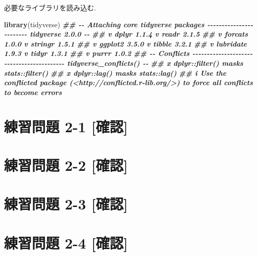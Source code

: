 \documentclass[
]{book}
\newenvironment{Shaded}{\begin{snugshade}}{\end{snugshade}}
\newcommand{\DocumentationTok}[1]{\textcolor[rgb]{0.56,0.35,0.01}{\textbf{\textit{#1}}}}
\newcommand{\FunctionTok}[1]{\textcolor[rgb]{0.13,0.29,0.53}{\textbf{#1}}}
\newcommand{\NormalTok}[1]{#1}
\begin{document}
必要なライブラリを読み込む.

\begin{Shaded}
\begin{Highlighting}[]
\FunctionTok{library}\NormalTok{(tidyverse)}
\DocumentationTok{\#\# {-}{-} Attaching core tidyverse packages {-}{-}{-}{-}{-}{-}{-}{-}{-}{-}{-}{-}{-}{-}{-}{-}{-}{-}{-}{-}{-}{-}{-}{-} tidyverse 2.0.0 {-}{-}}
\DocumentationTok{\#\# v dplyr     1.1.4     v readr     2.1.5}
\DocumentationTok{\#\# v forcats   1.0.0     v stringr   1.5.1}
\DocumentationTok{\#\# v ggplot2   3.5.0     v tibble    3.2.1}
\DocumentationTok{\#\# v lubridate 1.9.3     v tidyr     1.3.1}
\DocumentationTok{\#\# v purrr     1.0.2     }
\DocumentationTok{\#\# {-}{-} Conflicts {-}{-}{-}{-}{-}{-}{-}{-}{-}{-}{-}{-}{-}{-}{-}{-}{-}{-}{-}{-}{-}{-}{-}{-}{-}{-}{-}{-}{-}{-}{-}{-}{-}{-}{-}{-}{-}{-}{-}{-}{-}{-} tidyverse\_conflicts() {-}{-}}
\DocumentationTok{\#\# x dplyr::filter() masks stats::filter()}
\DocumentationTok{\#\# x dplyr::lag()    masks stats::lag()}
\DocumentationTok{\#\# i Use the conflicted package (\textless{}http://conflicted.r{-}lib.org/\textgreater{}) to force all conflicts to become errors}
\end{Highlighting}
\end{Shaded}

\hypertarget{ux7df4ux7fd2ux554fux984c-2-1-ux78baux8a8d}{%
\section*{練習問題 2-1 {[}確認{]}}\label{ux7df4ux7fd2ux554fux984c-2-1-ux78baux8a8d}}

\hypertarget{ux7df4ux7fd2ux554fux984c-2-2-ux78baux8a8d}{%
\section*{練習問題 2-2 {[}確認{]}}\label{ux7df4ux7fd2ux554fux984c-2-2-ux78baux8a8d}}

\hypertarget{ux7df4ux7fd2ux554fux984c-2-3-ux78baux8a8d}{%
\section*{練習問題 2-3 {[}確認{]}}\label{ux7df4ux7fd2ux554fux984c-2-3-ux78baux8a8d}}

\hypertarget{ux7df4ux7fd2ux554fux984c-2-4-ux78baux8a8d}{%
\section*{練習問題 2-4 {[}確認{]}}\label{ux7df4ux7fd2ux554fux984c-2-4-ux78baux8a8d}}
\end{document}
